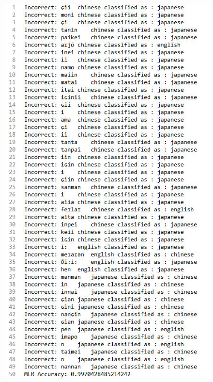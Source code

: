 \documentclass[a4paper]{article}
\begin{document}
\begin{figure}[H]
\centering
\includegraphics[width=\textwidth]{mlrresult.png}
\end{figure}
\end{document}

